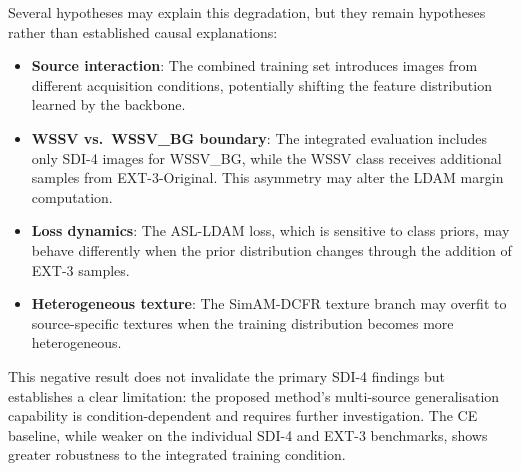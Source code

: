 Several hypotheses may explain this degradation, but they remain hypotheses rather than established causal explanations:

\begin{itemize}
    \item \textbf{Source interaction}: The combined training set introduces images from different acquisition conditions, potentially shifting the feature distribution learned by the backbone.
    \item \textbf{WSSV vs.~WSSV\_BG boundary}: The integrated evaluation includes only SDI-4 images for WSSV\_BG, while the WSSV class receives additional samples from EXT-3-Original. This asymmetry may alter the LDAM margin computation.
    \item \textbf{Loss dynamics}: The ASL-LDAM loss, which is sensitive to class priors, may behave differently when the prior distribution changes through the addition of EXT-3 samples.
    \item \textbf{Heterogeneous texture}: The SimAM-DCFR texture branch may overfit to source-specific textures when the training distribution becomes more heterogeneous.
\end{itemize}

This negative result does not invalidate the primary SDI-4 findings but establishes a clear limitation: the proposed method's multi-source generalisation capability is condition-dependent and requires further investigation. The CE baseline, while weaker on the individual SDI-4 and EXT-3 benchmarks, shows greater robustness to the integrated training condition.
